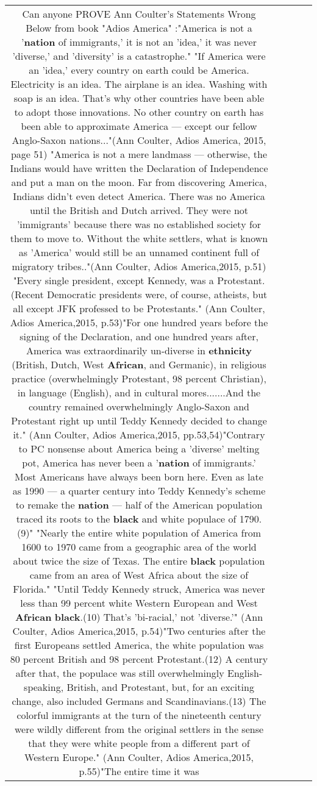 \documentclass[11pt]{article}
\newlength\mylength
\begin{document}
\begin{center}
\begin{longtable}{|C{.65\mylength}|C{.30\mylength}|C{.12\mylength}|C{.12\mylength}|C{.12\mylength}|}
  \small Can anyone PROVE Ann Coulter's Statements  Wrong   Below  from  book  "Adios  America"  :"America is not a '\textbf{nation} of immigrants,' it is not an 'idea,' it was never 'diverse,' and 'diversity' is a catastrophe." "If America were an 'idea,' every country on earth could be America. Electricity is an idea. The airplane is an idea. Washing with soap is an idea. That's why other countries have been able to adopt those innovations. No other country on earth has been able to approximate America — except our fellow Anglo-Saxon nations..."(Ann Coulter, Adios America, 2015, page 51) "America is not a mere landmass — otherwise, the Indians would have written the Declaration of Independence and put a man on the moon. Far from discovering America, Indians didn't even detect America. There was no America until the British and Dutch arrived. They were not 'immigrants' because there was no established society for them to move to. Without the white settlers, what is known as 'America' would still be an unnamed continent full of migratory tribes.."(Ann Coulter, Adios America,2015, p.51) "Every single president, except Kennedy, was a Protestant. (Recent Democratic presidents were, of course, atheists, but all except JFK professed to be Protestants." (Ann Coulter, Adios America,2015, p.53)"For one hundred years before the signing of the Declaration, and one hundred years after, America was extraordinarily un-diverse in \textbf{ethnicity} (British, Dutch, West \textbf{African}, and Germanic), in religious practice (overwhelmingly Protestant, 98 percent Christian), in language (English), and in cultural mores.......And the country remained overwhelmingly Anglo-Saxon and Protestant right up until Teddy Kennedy decided to change it." (Ann Coulter, Adios America,2015, pp.53,54)"Contrary to PC nonsense about America being a 'diverse' melting pot, America has never been a '\textbf{nation} of immigrants.' Most Americans have always been born here.  Even as late as 1990 — a quarter century into Teddy Kennedy's scheme to remake the \textbf{nation} — half of the American population traced its roots to the \textbf{black} and white populace of 1790.(9)" "Nearly the entire white population of America from 1600 to 1970 came from a geographic area of the world about twice the size of Texas. The entire \textbf{black} population came from an area of West Africa about the size of Florida." "Until Teddy Kennedy struck, America was never less than 99 percent white Western European and West \textbf{African} \textbf{black}.(10)  That's 'bi-racial,' not 'diverse.'" (Ann Coulter, Adios America,2015, p.54)"Two centuries after the first Europeans settled America, the white population was  80 percent British and 98 percent Protestant.(12)  A century after that, the populace was  still overwhelmingly English-speaking, British, and Protestant, but, for an exciting  change, also included Germans and Scandinavians.(13) The colorful immigrants at the turn of the nineteenth century were wildly different from the original settlers in the sense that they were white people from a different part of Western Europe." (Ann Coulter, Adios America,2015, p.55)"The entire time it was 
\end{longtable}
\end{center}
\end{document}
